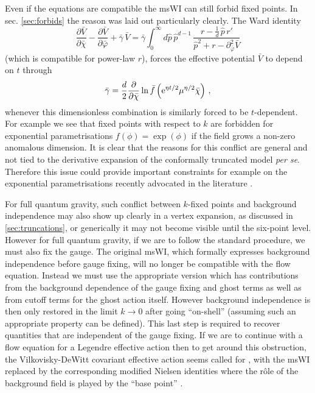 \documentclass[11pt,a4paper]{article}
\numberwithin{figure}{section}
\numberwithin{equation}{section}
\newcommand{\be}{\begin{equation}}
\newcommand{\ee}{\end{equation}}
\newcommand{\bc}{\bar \chi} %
\newcommand{\bV}{\bar V} %
\begin{document}
Even if the equations are compatible the msWI can still forbid fixed points. In sec. \ref{sec:forbids} the reason was laid out particularly clearly. The Ward identity
\be 
\frac{\partial \bar V}{\partial \bar\chi} - \frac{\partial \bar V}{\partial \bar\varphi} + \bar \gamma \, \bar V = \bar \gamma
\int_0^{\infty} d\hat p \, \hat p^{d-1} \, \frac{r - \frac{1}{d} \, \hat p \, r'}{\hat p^2 + r - \partial^2_{\bar\varphi}\bar V} 
\ee
(which is compatible for power-law $r$),
forces the effective potential $\bV$ to depend on $t$ through
\be 
\bar{\gamma} = \frac{d}{2}\frac{\partial}{\partial\bc}\ln\bar{f}\left({\rm e}^{\eta t/2}\mu^{\eta/2}\bc\right)\,,
\ee
whenever this dimensionless combination is similarly forced to be $t$-dependent. For example  we see that fixed points with respect to $k$ are forbidden for exponential parametrisations $f(\phi)= \exp(\phi)$  if the field grows a non-zero anomalous dimension.  It is clear that the reasons for this conflict are general and not tied to the derivative expansion of the conformally truncated model \textit{per se}. Therefore this issue could provide important constraints for example on the exponential parametrisations recently advocated in the literature \cite{Demmel:2015zfa,Eichhorn:2013xr,Eichhorn:2015bna,Nink:2014yya,Percacci:2015wwa,Labus:2015ska,Ohta:2015efa,Gies:2015tca,Dona:2015tnf}.

For full quantum gravity, such conflict between $k$-fixed points and background independence may also show up clearly in a vertex expansion, as discussed in \ref{sec:truncations}, or generically it may not become visible until the six-point level. However for full quantum gravity, if we are to follow the standard procedure, we must also fix the gauge. The original msWI, which formally expresses background independence before gauge fixing, will no longer be compatible with the flow equation. Instead we must use the appropriate version which has  contributions from the background dependence of the gauge fixing and ghost terms as well as from cutoff terms for the ghost action itself. However background independence is then only restored in the limit $k\to0$ after going ``on-shell'' (assuming such an appropriate property can be defined). This last step is required to recover quantities that are independent of the gauge fixing. If we are to continue with a flow equation for a Legendre effective action \cite{Wetterich:1992,Morris:1993} then to get around this obstruction, the Vilkovisky-DeWitt covariant effective action seems called for \cite{Branchina:2003ek,Donkin:2012ud,Demmel:2014hla,Safari:2015dva}, with the msWI replaced by the corresponding modified Nielsen identities where the r\^ole of the background field is played by the ``base point'' \cite{Pawlowski:2003sk}.
\end{document}
